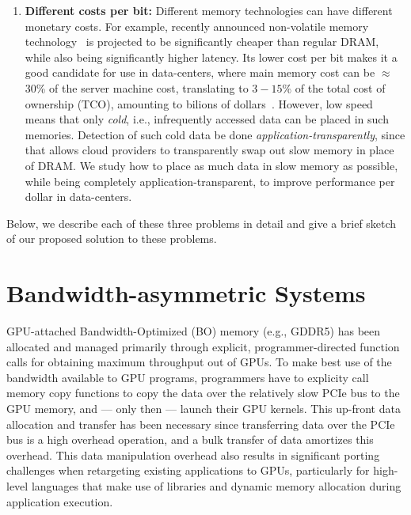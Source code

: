 \begin{enumerate}
\item
\textbf{Different costs per bit:}
Different memory technologies can have different monetary costs.  For example,
recently announced non-volatile memory technology~\cite{xpoint} is projected to
be significantly cheaper than regular DRAM, while also being significantly
higher latency. Its lower cost per bit makes it a good candidate for use in
data-centers, where main memory cost can be $\approx$ 30\% of the server machine
cost, translating to $3-15\%$ of the total cost of ownership (TCO), amounting to
bilions of dollars~\cite{borosso2013}. However,  low speed means that only
{\it cold}, i.e., infrequently accessed data can be placed in such memories.
Detection of such cold data  be done {\it application-transparently}, since
that allows cloud providers to transparently swap out slow memory in place of
DRAM.
We study how to place as much data in slow memory as possible, while being
completely application-transparent, to improve
performance per dollar in data-centers.  \end{enumerate}

Below, we describe each of these three problems in detail and give a brief
sketch of our proposed solution to these problems.

\section{Bandwidth-asymmetric Systems}
GPU-attached Bandwidth-Optimized (BO) memory (e.g., GDDR5) has been allocated
and managed primarily through explicit, programmer-directed function calls for
obtaining maximum throughput out of GPUs.  To make best use of the bandwidth
available to GPU programs, programmers have to explicity call memory copy
functions to copy the data over the relatively slow PCIe bus to the GPU memory,
and --- only then --- launch their GPU kernels.  This up-front data allocation
and transfer has been necessary since transferring data over the PCIe bus is a
high overhead operation, and a bulk transfer of data amortizes this overhead.
This data manipulation overhead also results in significant porting challenges
when retargeting existing applications to GPUs, particularly for high-level
languages that make use of libraries and dynamic memory allocation during
application execution.


